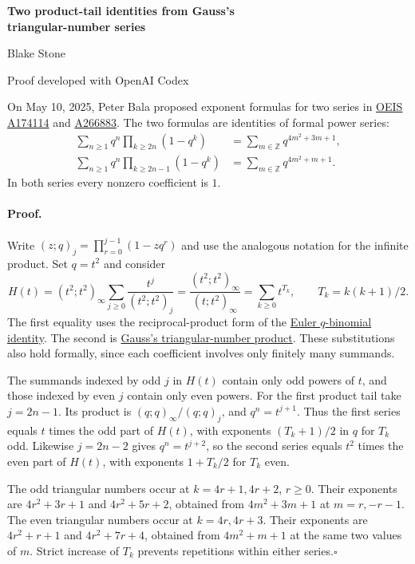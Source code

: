 \documentclass[11pt,letterpaper]{article}
\begin{document}
\begin{center}
{\LARGE\bfseries Two product-tail identities from Gauss's\\[2pt] triangular-number series}\par\vspace{7pt}
Blake Stone\par{\small Proof developed with OpenAI Codex}
\end{center}
On May 10, 2025, Peter Bala proposed exponent formulas for two series in \href{https://oeis.org/A174114}{OEIS A174114} and \href{https://oeis.org/A266883}{A266883}. The two formulas are identities of formal power series:
\[
\begin{aligned}
 \sum_{n\ge1}q^n\prod_{k\ge2n}(1-q^k)
 &=\sum_{m\in\mathbb Z}q^{4m^2+3m+1},\\
 \sum_{n\ge1}q^n\prod_{k\ge2n-1}(1-q^k)
 &=\sum_{m\in\mathbb Z}q^{4m^2+m+1}.
\end{aligned}
\]
In both series every nonzero coefficient is $1$.

\paragraph{Proof.} Write $(z;q)_j=\prod_{r=0}^{j-1}(1-zq^r)$ and use the analogous notation for the infinite product. Set $q=t^2$ and consider
\[
 H(t)=(t^2;t^2)_\infty\sum_{j\ge0}\frac{t^j}{(t^2;t^2)_j}
      =\frac{(t^2;t^2)_\infty}{(t;t^2)_\infty}
      =\sum_{k\ge0}t^{T_k},\qquad T_k=k(k+1)/2.
\]
The first equality uses the reciprocal-product form of the \href{https://dlmf.nist.gov/17.5}{Euler $q$-binomial identity}. The second is \href{https://uva.theopenscholar.com/files/ken-ono/files/003.pdf}{Gauss's triangular-number product}. These substitutions also hold formally, since each coefficient involves only finitely many summands.

The summands indexed by odd $j$ in $H(t)$ contain only odd powers of $t$, and those indexed by even $j$ contain only even powers. For the first product tail take $j=2n-1$. Its product is $(q;q)_\infty/(q;q)_j$, and $q^n=t^{j+1}$. Thus the first series equals $t$ times the odd part of $H(t)$, with exponents $(T_k+1)/2$ in $q$ for $T_k$ odd. Likewise $j=2n-2$ gives $q^n=t^{j+2}$, so the second series equals $t^2$ times the even part of $H(t)$, with exponents $1+T_k/2$ for $T_k$ even.

The odd triangular numbers occur at $k=4r+1,4r+2$, $r\ge0$. Their exponents are $4r^2+3r+1$ and $4r^2+5r+2$, obtained from $4m^2+3m+1$ at $m=r,-r-1$. The even triangular numbers occur at $k=4r,4r+3$. Their exponents are $4r^2+r+1$ and $4r^2+7r+4$, obtained from $4m^2+m+1$ at the same two values of $m$. Strict increase of $T_k$ prevents repetitions within either series.\hfill$\square$
\end{document}
